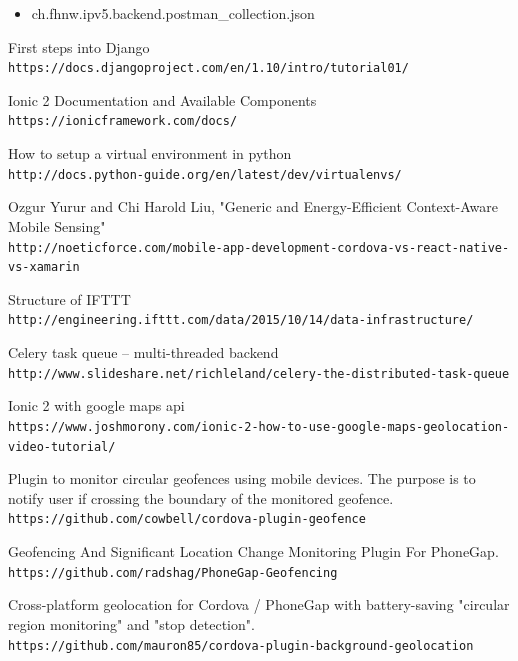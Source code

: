 \documentclass[11pt]{article} %
\begin{document}
\begin{appendices}
\begin{itemize}
  \item ch.fhnw.ipv5.backend.postman\_collection.json
\end{itemize}



\newpage
\listoffigures
\newpage



\begin{thebibliography}{9}
First steps into Django
\\\texttt{https://docs.djangoproject.com/en/1.10/intro/tutorial01/}

Ionic 2 Documentation and Available Components
\\\texttt{https://ionicframework.com/docs/}

How to setup a virtual environment in python
\\\texttt{http://docs.python-guide.org/en/latest/dev/virtualenvs/}

Ozgur Yurur and Chi Harold Liu, "Generic and Energy-Efficient Context-Aware Mobile Sensing"
\\\texttt{http://noeticforce.com/mobile-app-development-cordova-vs-react-native-vs-xamarin}

Structure of IFTTT
\\\texttt{http://engineering.ifttt.com/data/2015/10/14/data-infrastructure/}

Celery task queue – multi-threaded backend
\\\texttt{http://www.slideshare.net/richleland/celery-the-distributed-task-queue}

Ionic 2 with google maps api
\\\texttt{https://www.joshmorony.com/ionic-2-how-to-use-google-maps-geolocation-video-tutorial/}

Plugin to monitor circular geofences using mobile devices. The purpose is to notify user if crossing the boundary of the monitored geofence.
\\\texttt{https://github.com/cowbell/cordova-plugin-geofence}

Geofencing And Significant Location Change Monitoring Plugin For PhoneGap.
\\\texttt{https://github.com/radshag/PhoneGap-Geofencing}

Cross-platform geolocation for Cordova / PhoneGap with battery-saving "circular region monitoring" and "stop detection".
\\\texttt{https://github.com/mauron85/cordova-plugin-background-geolocation}


\end{thebibliography}
\end{appendices}
\end{document}
